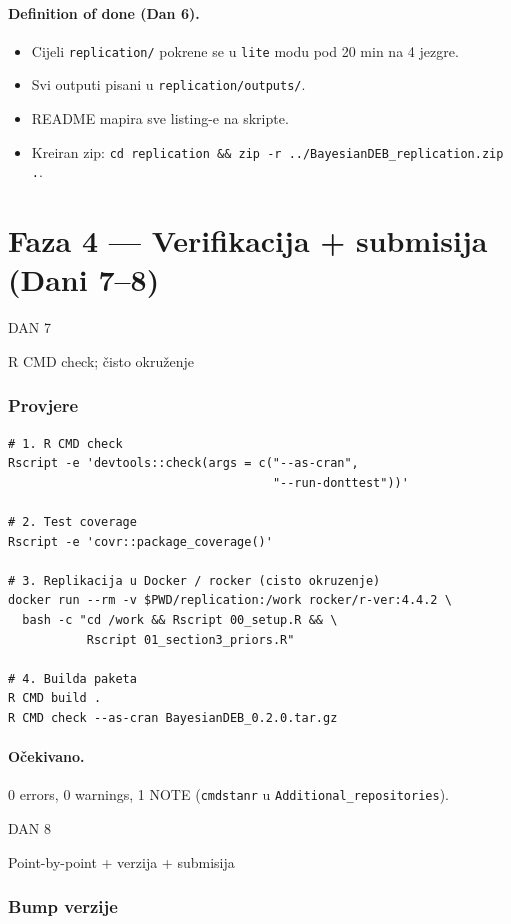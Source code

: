 \documentclass[11pt,a4paper]{article}
\newcommand{\dayhead}[2]{%
  \vspace{0.6em}\par\noindent%
  \colorbox{daygray}{\color{white}\bfseries\strut\;DAN #1\;}\;%
  \colorbox{daylight}{\color{daygray}\strut\;#2\;}\par\vspace{0.4em}%
}
\newcommand{\code}[1]{\texttt{\small #1}}
\begin{document}
\paragraph{Definition of done (Dan 6).}
\begin{itemize}[leftmargin=1.4em,nosep]
  \item Cijeli \code{replication/} pokrene se u \code{lite}
    modu pod 20 min na 4 jezgre.
  \item Svi outputi pisani u \code{replication/outputs/}.
  \item README mapira sve listing-e na skripte.
  \item Kreiran zip: \code{cd replication \&\& zip -r
    ../BayesianDEB\_replication.zip .}.
\end{itemize}

\section{Faza 4 --- Verifikacija + submisija (Dani 7--8)}

\dayhead{7}{R CMD check; čisto okruženje}

\subsubsection*{Provjere}

\begin{lstlisting}[style=Shellstyle]
# 1. R CMD check
Rscript -e 'devtools::check(args = c("--as-cran",
                                     "--run-donttest"))'

# 2. Test coverage
Rscript -e 'covr::package_coverage()'

# 3. Replikacija u Docker / rocker (cisto okruzenje)
docker run --rm -v $PWD/replication:/work rocker/r-ver:4.4.2 \
  bash -c "cd /work && Rscript 00_setup.R && \
           Rscript 01_section3_priors.R"

# 4. Builda paketa
R CMD build .
R CMD check --as-cran BayesianDEB_0.2.0.tar.gz
\end{lstlisting}

\paragraph{Očekivano.} 0 errors, 0 warnings, 1 NOTE
(\code{cmdstanr} u \code{Additional\_repositories}).

\dayhead{8}{Point-by-point + verzija + submisija}

\subsubsection*{Bump verzije}
\end{document}
